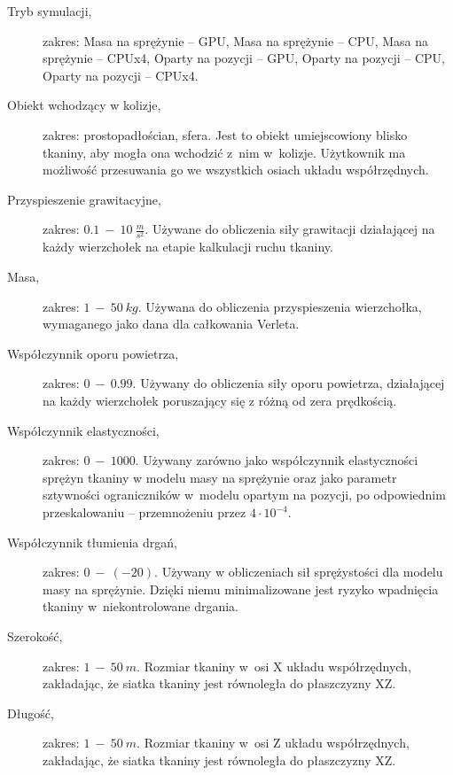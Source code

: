 			\begin{description}
				
				\item[Tryb symulacji,] zakres: Masa na sprężynie -- GPU, Masa na sprężynie -- CPU, Masa na sprężynie -- CPUx4, Oparty na pozycji -- GPU, Oparty na pozycji -- CPU, Oparty na pozycji -- CPUx4.
				
				\item[Obiekt wchodzący w kolizje,] zakres: prostopadłościan, sfera. Jest to obiekt umiejscowiony blisko tkaniny, aby mogła ona wchodzić z~nim w~kolizje. Użytkownik ma możliwość przesuwania go we wszystkich osiach układu współrzędnych.
				
				\item[Przyspieszenie grawitacyjne,] zakres: \(0.1\ -\ 10\ \frac{m}{s^{2}} \). Używane do obliczenia siły grawitacji działającej na każdy wierzchołek na etapie kalkulacji ruchu tkaniny.
				
				\item[Masa,] zakres: \(1\ -\ 50\ kg\). Używana do obliczenia przyspieszenia wierzchołka, wymaganego jako dana dla całkowania Verleta.
				
				\item[Współczynnik oporu powietrza,] zakres: \(0\ -\ 0.99\). Używany do obliczenia siły oporu powietrza, działającej na każdy wierzchołek poruszający się z różną od zera prędkością.
				
				\item[Współczynnik elastyczności,] zakres: \(0\ -\ 1000\). Używany zarówno jako współczynnik elastyczności sprężyn tkaniny w modelu masy na sprężynie oraz jako parametr sztywności ograniczników w~modelu opartym na pozycji, po odpowiednim przeskalowaniu -- przemnożeniu przez \( 4 \cdot 10^{-4} \).
				
				\item[Współczynnik tłumienia drgań,] zakres: \(0\ -\ (-20)\). Używany w obliczeniach sił sprężystości dla modelu masy na sprężynie. Dzięki niemu minimalizowane jest ryzyko wpadnięcia tkaniny w~niekontrolowane drgania.
				
				\item[Szerokość,] zakres: \(1\ -\ 50\ m\). Rozmiar tkaniny w~osi X układu współrzędnych, zakładając, że siatka tkaniny jest równoległa do płaszczyzny XZ.
				
				\item[Długość,] zakres: \(1\ -\ 50\ m\). Rozmiar tkaniny w~osi Z układu współrzędnych, zakładając, że siatka tkaniny jest równoległa do płaszczyzny XZ.
				

\end{description}
